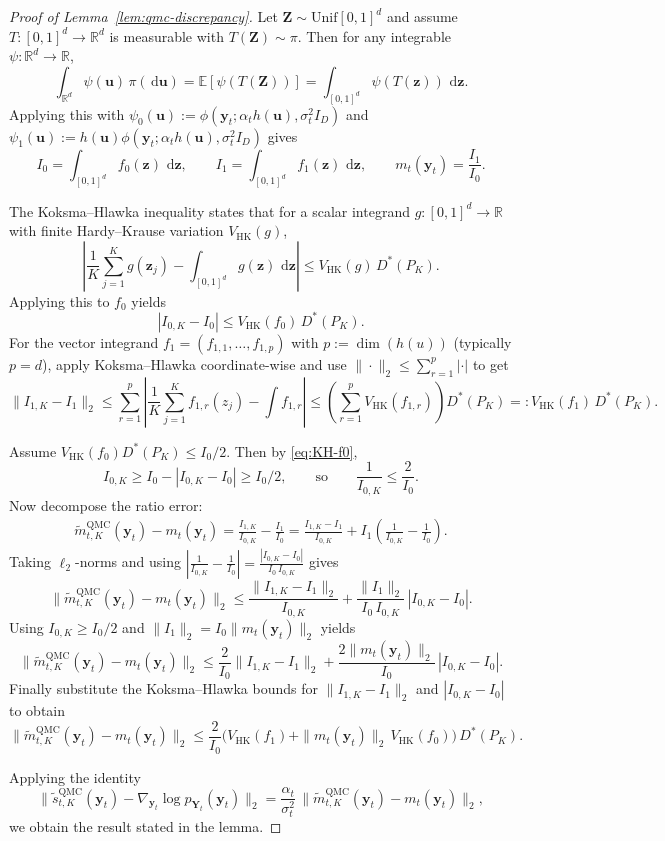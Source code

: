 \documentclass[12pt]{article}
\theoremstyle{definition} %
\newcommand{\R}{\mathbb{R}}
\newcommand{\dd}{\,\mathrm{d}}
\newcommand{\Y}{\bm Y}
\newcommand{\y}{\bm y}
\providecommand{\E}{\mathbb{E}}
\newcommand{\Unif}{\mathrm{Unif}}
\begin{document}
\begin{proof}[Proof of Lemma~\ref{lem:qmc-discrepancy}]

Let $\bm Z\sim\Unif[0,1]^d$ and assume $T:[0,1]^d\to\R^d$ is measurable with $T(\bm Z)\sim\pi$.
Then for any integrable $\psi:\R^d\to\R$,
\[
\int_{\R^d}\psi(\bm u)\,\pi(\dd \bm u)=\E[\psi(T(\bm Z))]=\int_{[0,1]^d}\psi(T(\bm z))\,\dd \bm z.
\]
Applying this with
$\psi_0(\bm u):=\phi\!\left(\y_t;\alpha_t h(\bm u),\sigma_t^2 I_D\right)$ and
$\psi_1(\bm u):=h(\bm u)\phi\!\left(\y_t;\alpha_t h(\bm u),\sigma_t^2 I_D\right)$ gives
\[
I_0=\int_{[0,1]^d} f_0(\bm z)\,\dd \bm z,\qquad I_1=\int_{[0,1]^d} f_1(\bm z)\,\dd \bm z,
\qquad m_t(\y_t)=\frac{I_1}{I_0}.
\]

The Koksma--Hlawka inequality \citep{niederreiter1992random} states that for a scalar integrand $g:[0,1]^d\to\R$
with finite Hardy--Krause variation $V_{\mathrm{HK}}(g)$,
\[
\left|\frac1K\sum_{j=1}^K g(\bm z_j)-\int_{[0,1]^d} g(\bm z)\,\dd \bm z\right|
\le V_{\mathrm{HK}}(g)\,D^\ast(P_K).
\]
Applying this to $f_0$ yields
\begin{equation}\label{eq:KH-f0}
|I_{0,K}-I_0|
\le V_{\mathrm{HK}}(f_0)\,D^\ast(P_K).
\end{equation}
For the vector integrand $f_1=(f_{1,1},\dots,f_{1,p})$ with $p:=\dim(h(u))$
(typically $p=d$), apply Koksma--Hlawka coordinate-wise and use
$\|\cdot\|_2\le \sum_{r=1}^p |\cdot|$ to get
\[
\|I_{1,K}-I_1\|_2
\le \sum_{r=1}^p \left|\frac1K\sum_{j=1}^K f_{1,r}(z_j)-\int f_{1,r}\right|
\le \left(\sum_{r=1}^p V_{\mathrm{HK}}(f_{1,r})\right) D^\ast(P_K)
=: V_{\mathrm{HK}}(f_1)\,D^\ast(P_K).
\]

Assume $V_{\mathrm{HK}}(f_0)D^\ast(P_K)\le I_0/2$. Then by \eqref{eq:KH-f0},
\[
I_{0,K}\ge I_0-|I_{0,K}-I_0|\ge I_0/2,
\qquad\text{so}\qquad
\frac1{I_{0,K}}\le \frac{2}{I_0}.
\]
Now decompose the ratio error:
\begin{align*}
\widetilde m^{\mathrm{QMC}}_{t,K}(\y_t)-m_t(\y_t)
=\frac{I_{1,K}}{I_{0,K}}-\frac{I_1}{I_0}
=\frac{I_{1,K}-I_1}{I_{0,K}}
+I_1\left(\frac1{I_{0,K}}-\frac1{I_0}\right).
\end{align*}
Taking $\ell_2$-norms and using
$\left|\frac1{I_{0,K}}-\frac1{I_0}\right|
=\frac{|I_{0,K}-I_0|}{I_0\,I_{0,K}}$ gives
\[
\|\widetilde m^{\mathrm{QMC}}_{t,K}(\y_t)-m_t(\y_t)\|_2
\le \frac{\|I_{1,K}-I_1\|_2}{I_{0,K}}
+\frac{\|I_1\|_2}{I_0\,I_{0,K}}\,|I_{0,K}-I_0|.
\]
Using $I_{0,K}\ge I_0/2$ and $\|I_1\|_2=I_0\|m_t(\y_t)\|_2$ yields
\[
\|\widetilde m^{\mathrm{QMC}}_{t,K}(\y_t)-m_t(\y_t)\|_2
\le \frac{2}{I_0}\|I_{1,K}-I_1\|_2
+\frac{2\|m_t(\y_t)\|_2}{I_0}\,|I_{0,K}-I_0|.
\]
Finally substitute the Koksma--Hlawka bounds for $\|I_{1,K}-I_1\|_2$
and $|I_{0,K}-I_0|$ to obtain
\[
\|\widetilde m^{\mathrm{QMC}}_{t,K}(\y_t)-m_t(\y_t)\|_2
\le
\frac{2}{I_0}\Big(V_{\mathrm{HK}}(f_1)+\|m_t(\y_t)\|_2\,V_{\mathrm{HK}}(f_0)\Big)\,D^\ast(P_K).
\]

Applying the identity
\[
\big\|\widetilde s^{\mathrm{QMC}}_{t,K}(\y_t)-\nabla_{\y_t}\log p_{\Y_t}(\y_t)\big\|_2
=\frac{\alpha_t}{\sigma_t^2}\,
\big\|\widetilde m^{\mathrm{QMC}}_{t,K}(\y_t)-m_t(\y_t)\big\|_2,
\]
we obtain the result stated in the lemma.
\end{proof}
\end{document}
